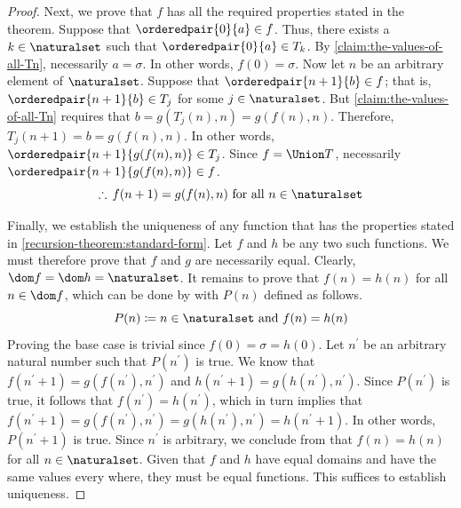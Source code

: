 \begin{proof}
    \vspace{0.3cm}
    \noindent
    Next, we prove that \( f \) has all the required properties stated in the theorem.
    Suppose that \( \orderedpair{0}{a} \in f \).
    Thus, there exists a \( k \in \naturalset \) such that \( \orderedpair{0}{a} \in T_{k} \).
    By \cref{claim:the-values-of-all-Tn}, necessarily \( a = \sigma \).
    In other words, \( f(0) = \sigma \).
    Now let \( n \) be an arbitrary element of \( \naturalset \).
    Suppose that \( \orderedpair{n+1}{b} \in f \); that is, \( \orderedpair{n+1}{b} \in T_{j} \) for some \( j \in \naturalset \).
    But \cref{claim:the-values-of-all-Tn} requires that \( b = g(T_{j}(n), n) = g(f(n), n) \).
    Therefore, \( T_{j}(n+1) = b = g(f(n), n) \).
    In other words, \( \orderedpair{n+1}{g(f(n), n)} \in T_{j} \).
    Since \( f = \Union T \), necessarily \( \orderedpair{n+1}{g(f(n), n)} \in f \).
    \begin{equation*}
        \therefore \, f(n + 1) = g(f(n), n) \ \text{for all \( n \in \naturalset \)}
    \end{equation*}

    \vspace{0.3cm}
    \noindent
    Finally, we establish the uniqueness of any function that has the properties stated in \cref{recursion-theorem:standard-form}.
    Let \( f \) and \( h \) be any two such functions.
    We must therefore prove that \( f \) and \( g \) are necessarily equal.
    Clearly, \( \dom f = \dom h = \naturalset \).
    It remains to prove that \( f(n) = h(n) \) for all \( n \in \dom f \), which can be done by  with
    \( P(n) \) defined as follows.
    \begin{equation*}
        P(n) \coloneq n \in \naturalset \ \text{and} \ f(n) = h(n)
    \end{equation*}
    Proving the base case is trivial since \( f(0) = \sigma = h(0) \).
    Let \( n^{\prime} \) be an arbitrary natural number such that \( P(n^{\prime}) \) is true.
    We know that \( f(n^{\prime} + 1) = g(f(n^{\prime}), n^{\prime}) \) and \( h(n^{\prime} + 1) = g(h(n^{\prime}), n^{\prime})  \).
    Since \( P(n^{\prime}) \) is true, it follows that \( f(n^{\prime}) = h(n^{\prime}) \), which in turn implies that
    \( f(n^{\prime} + 1) = g(f(n^{\prime}), n^{\prime}) = g(h(n^{\prime}), n^{\prime}) = h(n^{\prime} + 1) \).
    In other words, \( P(n^{\prime} + 1) \) is true.
    Since \( n^{\prime} \) is arbitrary, we conclude from  that \( f(n) = h(n) \) for all \( n \in \naturalset\).
    Given that \( f \) and \( h \) have equal domains and have the same values every where, they must be equal functions.
    This suffices to establish uniqueness.
\end{proof}

